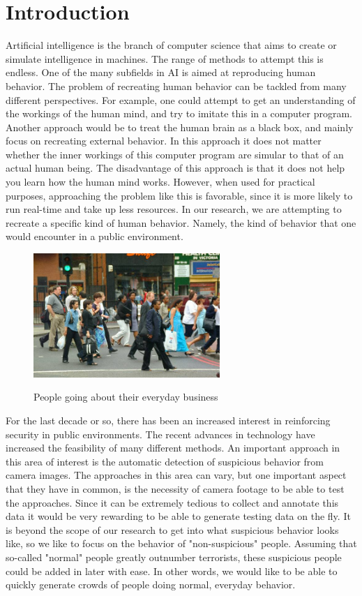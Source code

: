 \documentclass[11pt]{book}
\begin{document}
\chapter{Introduction}
Artificial intelligence is the branch of computer science that aims to create or simulate intelligence in machines. The range of methods to attempt this is endless. One of the many subfields in AI is aimed at reproducing human behavior. The problem of recreating human behavior can be tackled from many different perspectives. For example, one could attempt to get an understanding of the workings of the human mind, and try to imitate this in a computer program. Another approach would be to treat the human brain as a black box, and mainly focus on recreating external behavior. In this approach it does not matter whether the inner workings of this computer program are simular to that of an actual human being. The disadvantage of this approach is that it does not help you learn how the human mind works. However, when used for practical purposes, approaching the problem like this is favorable, since it is more likely to run real-time and take up less resources. In our research, we are attempting to recreate a specific kind of human behavior. Namely, the kind of behavior that one would encounter in a public environment.\\
\begin{figure}[h]
\begin{center}
\includegraphics[width=200pt]{pedestrians.jpg}
\label{pedestrianpicture}
\end{center}
\caption{People going about their everyday business}
\end{figure}
For the last decade or so, there has been an increased interest in reinforcing security in public environments. The recent advances in technology have increased the feasibility of many different methods. An important approach in this area of interest is the automatic detection of suspicious behavior from camera images. The approaches in this area can vary, but one important aspect that they have in common, is the necessity of camera footage to be able to test the approaches. Since it can be extremely tedious to collect and annotate this data it would be very rewarding to be able to generate testing data on the fly. It is beyond the scope of our research to get into what suspicious behavior looks like, so we like to focus on the behavior of "non-suspicious" people. Assuming that so-called "normal" people greatly outnumber terrorists, these suspicious people could be added in later with ease. In other words, we would like to be able to quickly generate crowds of people doing normal, everyday behavior.\\
\end{document}
